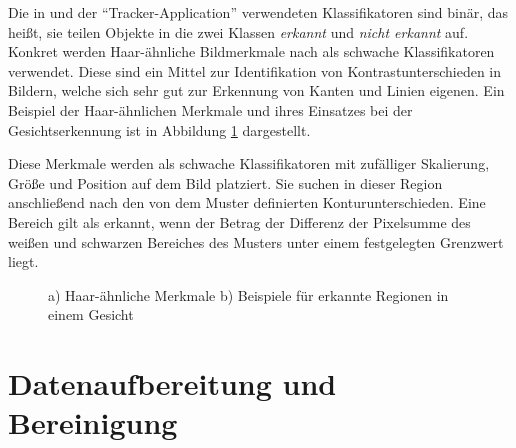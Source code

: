 Die in \cite[]{Grabner} und der ``Tracker-Application'' verwendeten Klassifikatoren sind binär, das heißt,
sie teilen Objekte in die zwei Klassen \textit{erkannt} und \textit{nicht erkannt} auf.
Konkret werden Haar-ähnliche Bildmerkmale nach \cite[]{Viola} als schwache Klassifikatoren verwendet.
Diese sind ein Mittel zur Identifikation von Kontrastunterschieden in Bildern, welche sich sehr gut
zur Erkennung von Kanten und Linien eigenen. Ein Beispiel der Haar-ähnlichen Merkmale und ihres Einsatzes
bei der Gesichtserkennung ist in Abbildung \ref{fig:grund_hair_like} dargestellt.

Diese Merkmale werden als schwache Klassifikatoren mit zufälliger Skalierung, Größe und Position
auf dem Bild platziert. Sie suchen in dieser Region anschließend nach den von dem Muster definierten
Konturunterschieden. Eine Bereich gilt als erkannt, wenn der Betrag der Differenz der Pixelsumme des weißen und
schwarzen Bereiches des Musters unter einem festgelegten Grenzwert liegt.

\begin{figure}[H]
    \centering
    \qquad
    \caption[a) Haar-ähnliche Merkmale b) Beispiele für erkannte Regionen in einem Gesicht]{a) Haar-ähnliche Merkmale b) Beispiele für erkannte Regionen in einem Gesicht \cite[]{DivyanshDwivedi2018}}
    \label{fig:grund_hair_like}
\end{figure}

\section{Datenaufbereitung und Bereinigung}
\label{sec:tra_preprocessing}

